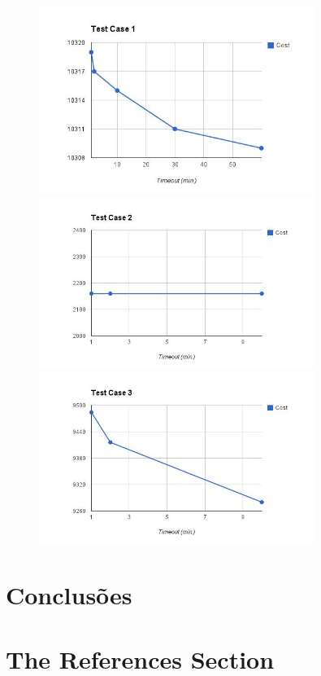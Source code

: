 \documentclass[runningheads,a4paper]{llncs}
\begin{document}
\begin{figure}[ht!]
\includegraphics[width=90mm]{test1.jpg}
\includegraphics[width=90mm]{test2.jpg}
\includegraphics[width=90mm]{test3.jpg}
\end{figure}





\section{Conclusões}





\section{The References Section}\label{references}
\end{document}
